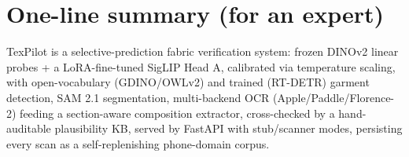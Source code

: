 \documentclass[11pt,a4paper]{article}
\begin{document}
\section{One-line summary (for an expert)}

TexPilot is a selective-prediction fabric verification system: frozen DINOv2
linear probes + a LoRA-fine-tuned SigLIP Head A, calibrated via temperature
scaling, with open-vocabulary (GDINO/OWLv2) and trained (RT-DETR) garment
detection, SAM 2.1 segmentation, multi-backend OCR (Apple/Paddle/Florence-2)
feeding a section-aware composition extractor, cross-checked by a hand-auditable
plausibility KB, served by FastAPI with stub/scanner modes, persisting every scan
as a self-replenishing phone-domain corpus.
\end{document}
